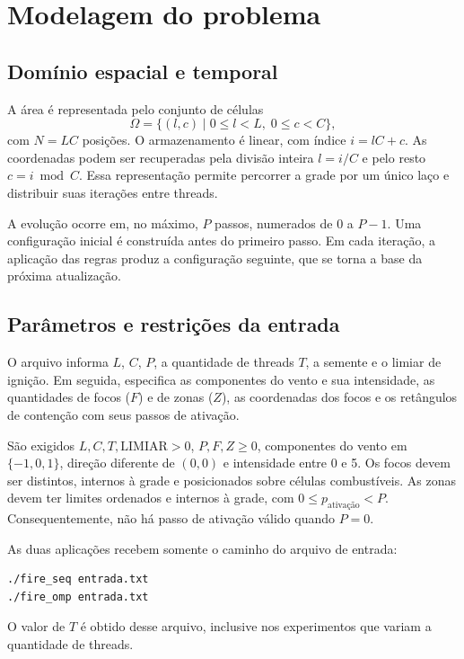 \documentclass[12pt,a4paper]{article}
\begin{document}
\section{Modelagem do problema}\label{sec:modelagem}

\subsection{Domínio espacial e temporal}

A área é representada pelo conjunto de células
\begin{equation}
\Omega=\{(l,c)\mid 0\leq l<L,\;0\leq c<C\},
\end{equation}
com $N=LC$ posições. O armazenamento é linear, com índice $i=lC+c$.
As coordenadas podem ser recuperadas pela divisão inteira $l=i/C$ e pelo
resto $c=i\bmod C$. Essa representação permite percorrer a grade por um
único laço e distribuir suas iterações entre threads.

A evolução ocorre em, no máximo, $P$ passos, numerados de $0$ a $P-1$.
Uma configuração inicial é construída antes do primeiro passo. Em cada
iteração, a aplicação das regras produz a configuração seguinte, que se
torna a base da próxima atualização.

\subsection{Parâmetros e restrições da entrada}\label{sec:entrada}

O arquivo informa $L$, $C$, $P$, a quantidade de threads $T$, a semente e
o limiar de ignição. Em seguida, especifica as componentes do vento e sua
intensidade, as quantidades de focos ($F$) e de zonas ($Z$), as coordenadas dos
focos e os retângulos de contenção com seus passos de ativação.

São exigidos $L,C,T,\mathrm{LIMIAR}>0$, $P,F,Z\geq0$,
componentes do vento em $\{-1,0,1\}$, direção diferente de $(0,0)$ e
intensidade entre 0 e 5. Os focos devem ser distintos, internos à grade e
posicionados sobre células combustíveis. As zonas devem ter limites
ordenados e internos à grade, com $0\leq p_{\text{ativação}}<P$.
Consequentemente, não há passo de ativação válido quando $P=0$.

As duas aplicações recebem somente o caminho do arquivo de entrada:
\begin{lstlisting}
./fire_seq entrada.txt
./fire_omp entrada.txt
\end{lstlisting}
O valor de $T$ é obtido desse arquivo, inclusive nos experimentos que
variam a quantidade de threads.
\end{document}
